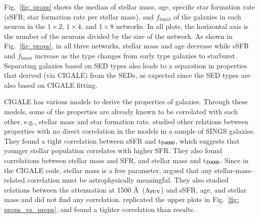        Fig.~\ref{fig: props} shows the median of stellar mass, age, specific star formation rate (sSFR; star formation rate per stellar mass), and $f_\mathrm{burst}$ of the galaxies in each neuron in the $1\times2$, $1\times4$, and $1\times8$ networks.
        In all plots, the horizontal axis is the number of the neurons divided by the size of the network.%
%        
        As shown in Fig.~\ref{fig: props}, in all three networks, stellar mass and age decrease while sSFR and $f_\mathrm{burst}$ increase as the type changes from early type galaxies to starburst. 
        Separating galaxies based on SED types also leads to a separation in properties that derived (via {\sc CIGALE}) from the SEDs, as expected since the SED types are also based on {\sc CIGALE} fitting. 
    
        
        {\sc CIGALE} has various models to derive the properties of galaxies.
        Through these models, some of the properties are already known to be correlated with each other, e.g., stellar mass and star formation rate.
         studied other relations between properties with no direct correlation in the models in a sample of SINGS galaxies.
        They found a tight correlation between sSFR and t$_{\rm {D4000}}$, which suggests that younger stellar population correlates with higher SFR.
        They also found correlations between stellar mass and SFR, and stellar mass and t$_{\rm {D4000}}$.
        Since in the {\sc CIGALE} code, stellar mass is a free parameter,  argued that any stellar-mass-related correlation must be astrophysically meaningful. 
        They also studied relations between the attenuation at 1500 \AA~(A$_{\rm {FUV}}$) and sSFR, age, and stellar mass and did not find any correlation.
         replicated the upper plots in Fig.~\ref{fig: props_vs_props}, and found a tighter correlation than  results. 
        
